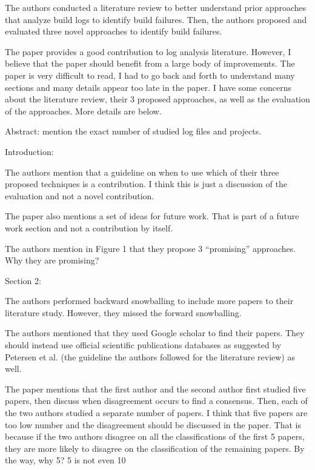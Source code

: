 \documentclass[10pt,a4wide]{article}
\renewenvironment{leftbar}{%
	\vspace{0.1cm}
	\def\FrameCommand{\vrule width 0.4pt \hspace{15pt}}%
	\MakeFramed {\advance\hsize-\width \FrameRestore}}%
{\endMakeFramed\vspace{0.1cm}}
\begin{document}
\begin{leftbar}
The authors conducted a literature review to better understand prior approaches that analyze build logs to identify build failures. Then, the authors proposed and evaluated three novel approaches to identify build failures.

The paper provides a good contribution to log analysis literature. However, I believe that the paper should benefit from a large body of improvements. The paper is very difficult to read, I had to go back and forth to understand many sections and many details appear too late in the paper. I have some concerns about the literature review, their 3 proposed approaches, as well as the evaluation of the approaches. More details are below.

Abstract: mention the exact number of studied log files and projects.

Introduction:

The authors mention that a guideline on when to use which of their three proposed techniques is a contribution. I think this is just a discussion of the evaluation and not a novel contribution.

The paper also mentions a set of ideas for future work. That is part of a future work section and not a contribution by itself.

The authors mention in Figure 1 that they propose 3 “promising” approaches. Why they are promising?

Section 2:

The authors performed backward snowballing to include more papers to their literature study. However, they missed the forward snowballing.

The authors mentioned that they used Google scholar to find their papers. They should instead use official scientific publications databases as suggested by Petersen et al. (the guideline the authors followed for the literature review) as well.

The paper mentions that the first author and the second author first studied five papers, then discuss when disagreement occurs to find a consensus. Then, each of the two authors studied a separate number of papers. I think that five papers are too low number and the disagreement should be discussed in the paper. That is because if the two authors disagree on all the classifications of the first 5 papers, they are more likely to disagree on the classification of the remaining papers. By the way, why 5? 5 is not even 10%


\end{leftbar}
\end{document}
